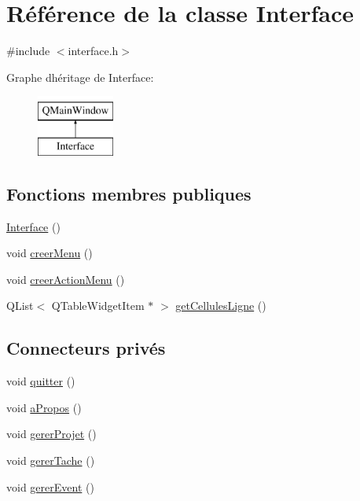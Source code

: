 \hypertarget{class_interface}{}\section{Référence de la classe Interface}
\label{class_interface}


{\ttfamily \#include $<$interface.\+h$>$}

Graphe d\textquotesingle{}héritage de Interface\+:\begin{figure}[H]
\begin{center}
\leavevmode
\includegraphics[height=2.000000cm]{class_interface}
\end{center}
\end{figure}
\subsection*{Fonctions membres publiques}
\begin{DoxyCompactItemize}
\item 
\hyperlink{class_interface_a4406d74c75bdfe150bf72be1f1cda8b1}{Interface} ()
\item 
void \hyperlink{class_interface_ab16225b70e5b896ce72ff1f635f4ea80}{creer\+Menu} ()
\item 
void \hyperlink{class_interface_a6e75d088bb17b45927e717cfa02efb46}{creer\+Action\+Menu} ()
\item 
Q\+List$<$ Q\+Table\+Widget\+Item $\ast$ $>$ \hyperlink{class_interface_ad79d4272b59a608ae0c0b48692bdc0fc}{get\+Cellules\+Ligne} ()
\end{DoxyCompactItemize}
\subsection*{Connecteurs privés}
\begin{DoxyCompactItemize}
\item 
void \hyperlink{class_interface_adba89efb181d1e4bc73b1fcaf19da136}{quitter} ()
\item 
void \hyperlink{class_interface_aa1740b524bd3d5a616c3da169b21bbe2}{a\+Propos} ()
\item 
void \hyperlink{class_interface_a2453496cddd1a8f8935c4cee547535b8}{gerer\+Projet} ()
\item 
void \hyperlink{class_interface_a579f816488ab284b650d9a6f5b2afe95}{gerer\+Tache} ()
\item 
void \hyperlink{class_interface_a7e65fe818b99979831ea4aea34ce1222}{gerer\+Event} ()
\end{DoxyCompactItemize}
